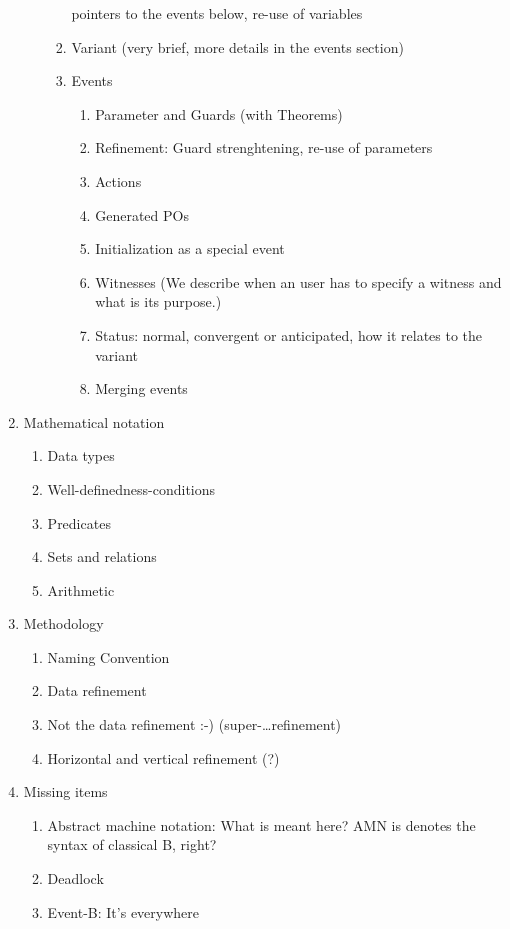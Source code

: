 \begin{enumerate}
\begin{enumerate}
\begin{enumerate}
      pointers to the events below, re-use of variables
    \item Variant (very brief, more details in the events section)
    \item Events
      \begin{enumerate}
      \item Parameter and Guards (with Theorems)
      \item Refinement: Guard strenghtening, re-use of parameters
      \item Actions
      \item Generated POs
      \item Initialization as a special event
      \item Witnesses (We describe when an user has to specify a witness and
        what is its purpose.)
      \item Status: normal, convergent or anticipated, how it relates to the variant
      \item Merging events
      \end{enumerate}
    \end{enumerate}
  \end{enumerate}
\item Mathematical notation
  \begin{enumerate}
  \item Data types
  \item Well-definedness-conditions
  \item Predicates
  \item Sets and relations
  \item Arithmetic
  \end{enumerate}
\item Methodology
  \begin{enumerate}
  \item Naming Convention
  \item Data refinement
  \item Not the data refinement :-) (super-\ldots refinement)
  \item Horizontal and vertical refinement (?)
  \end{enumerate}
\item Missing items
  \begin{enumerate}
  \item Abstract machine notation: What is meant here? AMN is denotes the syntax of classical B, right?
  \item Deadlock
  \item Event-B: It's everywhere

\end{enumerate}
\end{enumerate}
